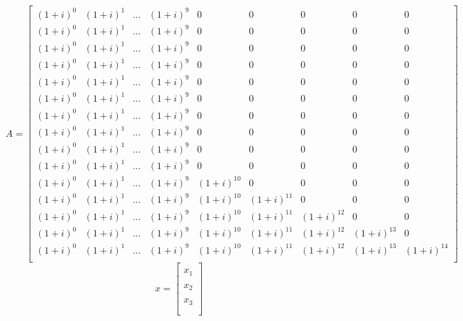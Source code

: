 \documentclass[11pt, a4paper, titlepage, openright]{article}
\begin{document}
    \[
        A =
        \begin{bmatrix}
            (1+i)^{0} & (1+i)^{1} & ... & (1+i)^{9} & 0 & 0 & 0 & 0 & 0 \\
            (1+i)^{0} & (1+i)^{1} & ... & (1+i)^{9} & 0 & 0 & 0 & 0 & 0 \\
            (1+i)^{0} & (1+i)^{1} & ... & (1+i)^{9} & 0 & 0 & 0 & 0 & 0 \\
            (1+i)^{0} & (1+i)^{1} & ... & (1+i)^{9} & 0 & 0 & 0 & 0 & 0 \\
            (1+i)^{0} & (1+i)^{1} & ... & (1+i)^{9} & 0 & 0 & 0 & 0 & 0 \\
            (1+i)^{0} & (1+i)^{1} & ... & (1+i)^{9} & 0 & 0 & 0 & 0 & 0 \\
            (1+i)^{0} & (1+i)^{1} & ... & (1+i)^{9} & 0 & 0 & 0 & 0 & 0 \\
            (1+i)^{0} & (1+i)^{1} & ... & (1+i)^{9} & 0 & 0 & 0 & 0 & 0 \\
            (1+i)^{0} & (1+i)^{1} & ... & (1+i)^{9} & 0 & 0 & 0 & 0 & 0 \\
            (1+i)^{0} & (1+i)^{1} & ... & (1+i)^{9} & 0 & 0 & 0 & 0 & 0 \\
            (1+i)^{0} & (1+i)^{1} & ... & (1+i)^{9} & (1+i)^{10} & 0 & 0 & 0 & 0 \\
            (1+i)^{0} & (1+i)^{1} & ... & (1+i)^{9} & (1+i)^{10} & (1+i)^{11} & 0 & 0 & 0 \\
            (1+i)^{0} & (1+i)^{1} & ... & (1+i)^{9} & (1+i)^{10} & (1+i)^{11} & (1+i)^{12} & 0 & 0 \\
            (1+i)^{0} & (1+i)^{1} & ... & (1+i)^{9} & (1+i)^{10} & (1+i)^{11} & (1+i)^{12} & (1+i)^{13} & 0 \\
            (1+i)^{0} & (1+i)^{1} & ... & (1+i)^{9} & (1+i)^{10} & (1+i)^{11} & (1+i)^{12} & (1+i)^{13} & (1+i)^{14} \\
        \end{bmatrix}
        \] \[
        x =
        \begin{bmatrix}
            \\
            x_{1} \\\\
            x_{2} \\\\
            x_{3} \\\\

\end{bmatrix}\]
\end{document}
